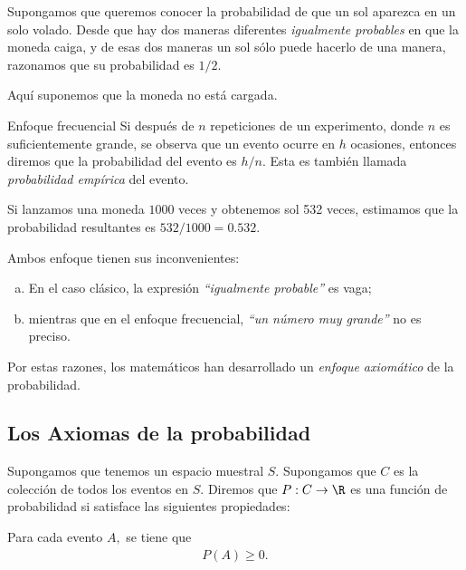  \begin{ejemplo}
  \label{exmp:1.10}
  Supongamos que queremos conocer la probabilidad de que un sol aparezca en un solo volado.  Desde que hay dos maneras diferentes \emph{igualmente probables} en que la moneda caiga,  y de esas dos maneras un sol sólo puede hacerlo de una manera, razonamos que su probabilidad es $1/2.$
    

  \begin{rem}
   Aquí suponemos que la moneda no está cargada.
  \end{rem}

 \end{ejemplo}


{Enfoque frecuencial}
Si después de $n$ repeticiones de un experimento, donde $n$ es suficientemente grande, se observa que un evento ocurre en $h$ ocasiones, entonces diremos que la probabilidad del evento es $h/n.$  Esta es también llamada \emph{probabilidad empírica} del evento.

{}
\begin{ejemplo}
 \label{exmp:1.11}
 Si lanzamos una moneda $1000$ veces y obtenemos sol 532 veces, estimamos que la probabilidad resultantes es $532/1000=0.532$.
\end{ejemplo}



 \begin{rem}
  Ambos enfoque tienen sus inconvenientes:
  \begin{enumerate}[(a)]
   \item En el caso clásico, la expresión \emph{``igualmente probable''} es vaga; 
   \item mientras que en el enfoque frecuencial, \emph{``un número muy grande''} no es preciso. 
  \end{enumerate}
Por estas razones, los matemáticos han desarrollado un \emph{enfoque axiomático} de la probabilidad.
 \end{rem}


\subsection{Los Axiomas de la probabilidad}
{}
Supongamos que tenemos un espacio muestral $S.$ Supongamos que $C$ es la colección de todos los eventos en $S.$ Diremos que $P:C \to \R$ es una función de probabilidad si satisface las siguientes propiedades:



\begin{axiom}
   Para cada evento $A,$ se tiene que
   \begin{align}
   \label{1.1}
    P(A)\geq 0.
   \end{align}

\end{axiom}



